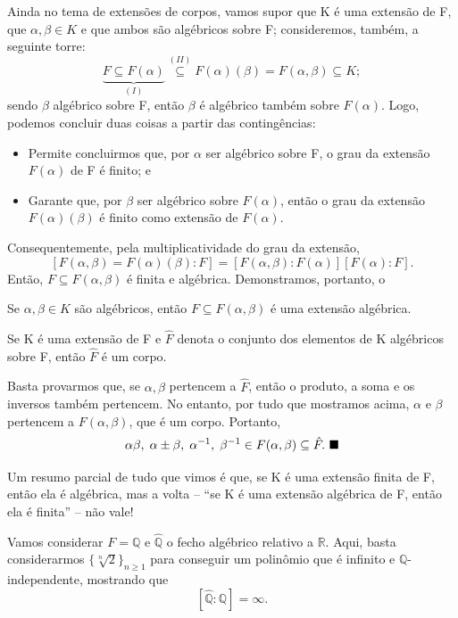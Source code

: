 \documentclass[../algebraIII_notes.tex]{subfiles}
\begin{document}
Ainda no tema de extensões de corpos, vamos supor que K é uma extensão de F, que \(\alpha , \beta \in K\) e que ambos são algébricos sobre F; consideremos, também, a seguinte torre:
\[
	\underbrace{F\subseteq F(\alpha )}_{(I)}\stackrel{(II)}\subseteq F(\alpha )(\beta )=F(\alpha , \beta )\subseteq K;
\]
sendo \(\beta \) algébrico sobre F, então \(\beta \) é algébrico também sobre \(F(\alpha )\). Logo, podemos concluir duas coisas a partir das contingências:
\begin{itemize}
	\item[I)] Permite concluirmos que, por \(\alpha \) ser algébrico sobre F, o grau da extensão \(F(\alpha )\) de F é finito; e
	\item[II)] Garante que, por \(\beta \) ser algébrico sobre \(F(\alpha )\), então o grau da extensão \(F(\alpha )(\beta )\) é finito como extensão de \(F(\alpha )\).
\end{itemize}
Consequentemente, pela multiplicatividade do grau da extensão,
\[
	[F(\alpha , \beta )=F(\alpha )(\beta ):F]=[F(\alpha , \beta ):F(\alpha )][F(\alpha ):F].
\]
Então, \(F\subseteq F(\alpha , \beta )\) é finita e algébrica. Demonstramos, portanto, o
\begin{lemma*}
	Se \(\alpha , \beta \in K\) são algébricos, então \(F\subseteq F(\alpha , \beta )\) é uma extensão algébrica.
\end{lemma*}
\begin{theorem*}
	Se K é uma extensão de F e \(\hat{F}\) denota o conjunto dos elementos de K algébricos sobre F, então \(\hat{F}\) é um corpo.
\end{theorem*}
\begin{proof*}
	Basta provarmos que, se \(\alpha , \beta \) pertencem a \(\hat{F}\), então o produto, a soma e os inversos também pertencem. No entanto, por tudo que mostramos acima, \(\alpha \) e \(\beta \) pertencem a \(F(\alpha , \beta )\), que é um corpo. Portanto,
	\[
		\alpha \beta , \; \alpha \pm \beta ,\; \alpha^{-1},\; \beta^{-1}\in F(\alpha , \beta )\subseteq \hat{F}. \text{ $\blacksquare$}
	\]
\end{proof*}

Um resumo parcial de tudo que vimos é que, se K é uma extensão finita de F, então ela é algébrica, mas a volta -- ``se K é uma extensão algébrica de F, então ela é finita'' -- não vale!
\begin{example}
	Vamos considerar \(F=\mathbb{Q}\) e \(\hat{\mathbb{Q}}\) o fecho algébrico relativo a \(\mathbb{R}\). Aqui, basta considerarmos \(\{\sqrt[n]{2}\}_{n\geq 1}\) para conseguir um polinômio que é infinito e \(\mathbb{Q}\)-independente, mostrando que
	\[
		[\hat{\mathbb{Q}}:\mathbb{Q}]=\infty.
	\]
\end{example}
\end{document}
